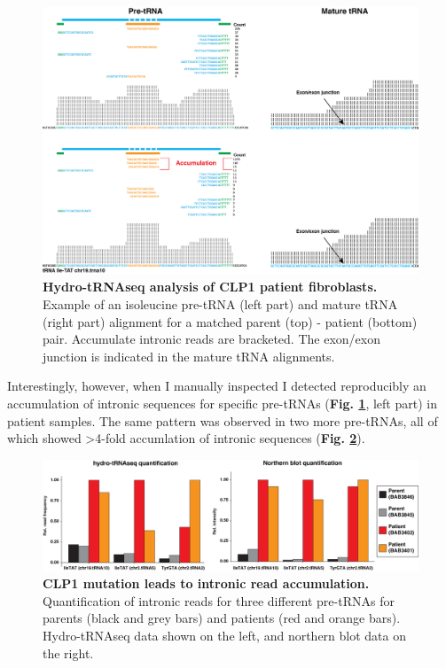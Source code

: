 \documentclass[12pt]{rockefeller}
\begin{document}
\begin{figure}[!ht]%
\centering
\includegraphics[width=\textwidth]{clp1align.png}%
\caption[Hydro-tRNAseq analysis of CLP1 patient fibroblasts.]{\textbf{Hydro-tRNAseq analysis of CLP1 patient fibroblasts.} 
Example of an isoleucine pre-tRNA (left part) and mature tRNA (right part) alignment for a matched parent (top) - patient (bottom) pair. Accumulate intronic reads are bracketed. The exon/exon junction is indicated in the mature tRNA alignments.}
\centering
\label{clp1align}%
\end{figure}

Interestingly, however, when I manually inspected I detected reproducibly an accumulation of intronic sequences for specific pre-tRNAs (\textbf{Fig. \ref{clp1align}}, left part) in patient samples. The same pattern was observed in two more pre-tRNAs, all of which showed >4-fold accumlation of intronic sequences (\textbf{Fig. \ref{clp1bars2}}).

\begin{figure}[!ht]%
\centering
\includegraphics[width=\textwidth]{clp1bars2.png}%
\caption[CLP1 mutation leads to intronic read accumulation.]
{\textbf{CLP1 mutation leads to intronic read accumulation.}
Quantification of intronic reads for three different pre-tRNAs for parents (black and grey bars) and patients (red and orange bars). Hydro-tRNAseq data shown on the left, and northern blot data on the right.}
\centering
\label{clp1bars2}%
\end{figure}
\end{document}
